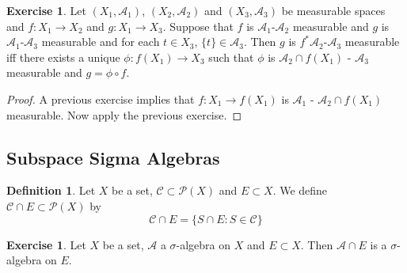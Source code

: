 \documentclass[12pt]{amsart}
\theoremstyle{definition}
\newtheorem{defn}[definition]{Definition}
\newtheorem{ex}[definition]{Exercise}
\newcommand{\sig}{\sigma}
\newcommand{\MA}{\mathcal{A}}
\newcommand{\MC}{\mathcal{C}}
\newcommand{\MP}{\mathcal{P}}
\newcommand{\lex}[1]{\label{ex:#1}}
\newcommand{\ld}[1]{\label{defn:#1}}
\begin{document}
	\begin{ex}
		Let $(X_1, \MA_1)$, $(X_2, \MA_2)$ and $(X_3, \MA_3)$ be measurable spaces and $f: X_1 \rightarrow X_2$ and $g:X_1 \rightarrow X_3$. Suppose that $f$ is $\MA_1$-$\MA_2$ measurable and $g$ is $\MA_1$-$\MA_3$ measurable and for each $t \in X_3$, $\{t\} \in \MA_3$. Then $g$ is $f^*\MA_2$-$\MA_3$ measurable iff there exists a unique $\phi: f(X_1) \rightarrow X_3$ such that $\phi$ is $\MA_2 \cap f(X_1)$ - $\MA_3$ measurable and $g = \phi \circ f$. \\
	\end{ex}
	
	\begin{proof}
		A previous exercise implies that $f: X_1 \rightarrow f(X_1)$ is $\MA_1$ - $\MA_2 \cap f(X_1)$ measurable. Now apply the previous exercise. 
	\end{proof}


	
	
	
	
	
	
	
	
	
	
	
	
	
	
	
	
	
	
	
	
	
	
	
	
	
	\newpage
	\subsection{Subspace Sigma Algebras}
	\begin{defn} \ld{00000} 
		Let $X$ be a set, $\MC \subset \MP(X)$ and $E \subset X$. We define $\MC \cap E \subset \MP(X)$ by $$\MC \cap E = \{S \cap E: S \in \MC\}$$ 
	\end{defn}
	
	\begin{ex} \lex{00000} 
		Let $X$ be a set, $\MA$ a $\sig$-algebra on $X$ and $E \subset X$. Then 
		$\MA \cap E$ is a $\sig$-algebra on $E$. 
	\end{ex}
	
\end{document}
